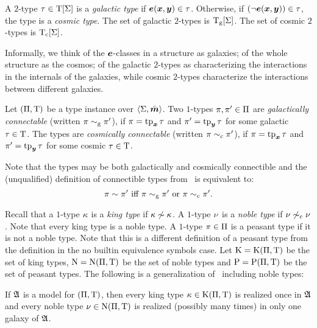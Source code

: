 \begin{definition}
A $2$-type $\tau \in \mathrm{T}[\mathrm{\Sigma}]$ is a \emph{galactic type} if $\bm{e}(\bm{x},\bm{y}) \in
\tau$.
Otherwise, if $(\lnot\bm{e}(\bm{x},\bm{y})) \in \tau$, the type is a \emph{cosmic type}.
The set of galactic $2$-types is $\mathrm{T}_{\mathrm{g}}[\mathrm{\Sigma}]$.
The set of cosmic $2$-types is $\mathrm{T}_{\mathrm{c}}[\mathrm{\Sigma}]$.
\end{definition}
Informally, we think of the $\bm{e}$-classes in a structure as galaxies; of the
whole structure as the cosmos; of the galactic $2$-types as characterizing the
interactions in the internals of the galaxies, while cosmic $2$-types
characterize the interactions between different galaxies.

\begin{definition}
Let $(\Pi,\mathrm{T})$ be a type instance over $\left\langle \mathrm{\Sigma},\bar{\bm{m}} \right\rangle$.
Two $1$-types $\pi, {\pi'} \in \Pi$ are \emph{galactically connectable}
(written $\pi \sim_{\mathrm{g}} {\pi'}$), if $\pi = \operatorname{tp}_{\bm{x}}\tau$ and ${\pi'} = \operatorname{tp}_{\bm{y}}\tau$
for some galactic $\tau \in \mathrm{T}$.
The types are \emph{cosmically connectable} (written $\pi \sim_{\mathrm{c}} {\pi'}$), if
$\pi = \operatorname{tp}_{\bm{x}}\tau$ and ${\pi'} = \operatorname{tp}_{\bm{y}}\tau$ for some cosmic $\tau \in \mathrm{T}$.
\end{definition}

Note that the types may be both galactically and cosmically connectible and the
(unqualified) definition of connectible types from~ is
equivalent to:
\[\pi \sim {\pi'} \text{ iff } \pi \sim_{\mathrm{g}} {\pi'} \text{ or } \pi \sim_{\mathrm{c}}
{\pi'}.\]

Recall that a $1$-type $\kappa$ is a \emph{king type} if $\kappa \not\sim \kappa$.
A $1$-type $\nu$ is a \emph{noble type} if $\nu \not\sim_{\mathrm{c}} \nu$. Note that
every king type is a noble type. A $1$-type $\pi \in \Pi$ is a peasant type
if it is not a noble type.
Note that this is a different definition of a peasant type from the definition in the
no builtin equivalence symbols case.
Let $\mathrm{K} = \mathrm{K}(\Pi,\mathrm{T})$ be the set of king types, $\mathrm{\mathrm{N}} = \mathrm{\mathrm{N}}(\Pi,\mathrm{T})$
be the set of noble types and $\mathrm{P} = \mathrm{P}(\Pi,\mathrm{T})$ be the set of peasant
types. The following is a generalization of~
including noble types:
\begin{remark}\label{rem:twovar-noble-once}
If $\mathfrak{A}$ is a model for $(\Pi,\mathrm{T})$, then every king type
$\kappa \in \mathrm{K}(\Pi,\mathrm{T})$ is realized once in $\mathfrak{A}$ and every noble type
$\nu \in \mathrm{\mathrm{N}}(\Pi,\mathrm{T})$ is realized (possibly many times) in only one galaxy
of $\mathfrak{A}$.
\end{remark}

